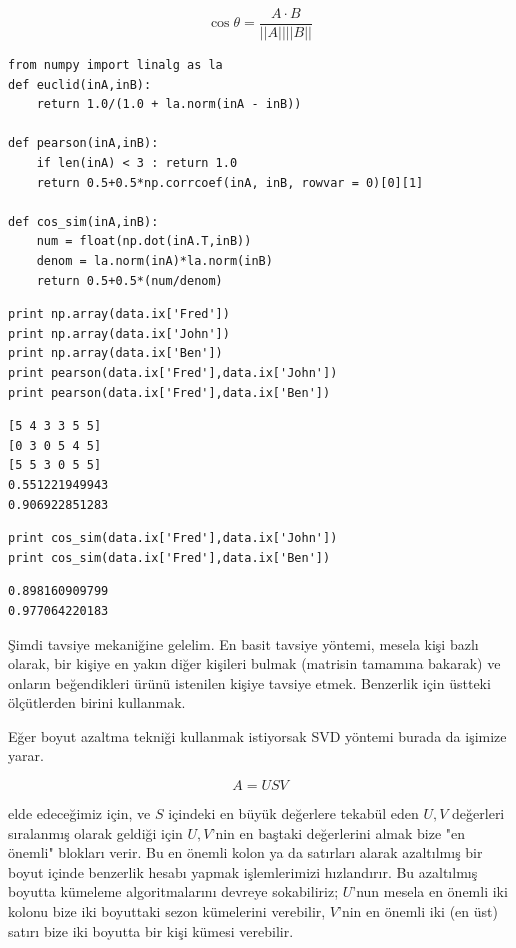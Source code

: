\documentclass[12pt,fleqn]{article}\usepackage{../../common}
\begin{document}
$$
\cos\theta = \frac{A \cdot B}{||A||||B||}
$$

\begin{verbatim}
from numpy import linalg as la
def euclid(inA,inB):
    return 1.0/(1.0 + la.norm(inA - inB))

def pearson(inA,inB):
    if len(inA) < 3 : return 1.0
    return 0.5+0.5*np.corrcoef(inA, inB, rowvar = 0)[0][1]

def cos_sim(inA,inB):
    num = float(np.dot(inA.T,inB))
    denom = la.norm(inA)*la.norm(inB)
    return 0.5+0.5*(num/denom)
\end{verbatim}

\begin{verbatim}
print np.array(data.ix['Fred'])
print np.array(data.ix['John'])
print np.array(data.ix['Ben'])
print pearson(data.ix['Fred'],data.ix['John'])
print pearson(data.ix['Fred'],data.ix['Ben'])
\end{verbatim}

\begin{verbatim}
[5 4 3 3 5 5]
[0 3 0 5 4 5]
[5 5 3 0 5 5]
0.551221949943
0.906922851283
\end{verbatim}

\begin{verbatim}
print cos_sim(data.ix['Fred'],data.ix['John'])
print cos_sim(data.ix['Fred'],data.ix['Ben'])
\end{verbatim}

\begin{verbatim}
0.898160909799
0.977064220183
\end{verbatim}

Şimdi tavsiye mekaniğine gelelim. En basit tavsiye yöntemi, mesela
kişi bazlı olarak, bir kişiye en yakın diğer kişileri bulmak (matrisin
tamamına bakarak) ve onların beğendikleri ürünü istenilen kişiye
tavsiye etmek. Benzerlik için üstteki ölçütlerden birini kullanmak.















Eğer boyut azaltma tekniği kullanmak istiyorsak SVD yöntemi burada da işimize
yarar.

$$ A = USV  $$

elde edeceğimiz için, ve $S$ içindeki en büyük değerlere tekabül eden
$U,V$ değerleri sıralanmış olarak geldiği için $U,V$'nin en baştaki
değerlerini almak bize "en önemli" blokları verir. Bu en önemli kolon
ya da satırları alarak azaltılmış bir boyut içinde benzerlik hesabı
yapmak işlemlerimizi hızlandırır. Bu azaltılmış boyutta kümeleme
algoritmalarını devreye sokabiliriz; $U$'nun mesela en önemli iki
kolonu bize iki boyuttaki sezon kümelerini verebilir, $V$'nin en
önemli iki (en üst) satırı bize iki boyutta bir kişi kümesi verebilir.
\end{document}
